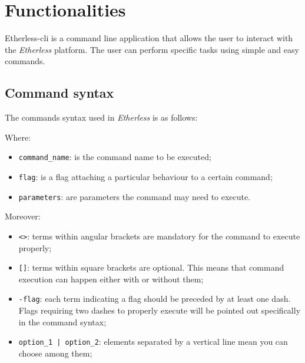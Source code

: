\section{Functionalities}
Etherless-cli is a command line application that allows the user to interact with the \textit{Etherless} platform. The user can perform specific tasks using simple and easy commands.

\subsection{Command syntax}
The commands syntax used in \textit{Etherless} is as follows:
\begin{center}
\end{center}
Where:
\begin{itemize}
	\item \texttt{command\_name}: is the command name to be executed;
	\item \texttt{flag}: is a flag attaching a particular behaviour to a certain command;
	\item \texttt{parameters}: are parameters the command may need to execute.
\end{itemize}
Moreover:
\begin{itemize}
	\item \texttt{<>}: terms within angular brackets are mandatory for the command to execute properly;
	\item \texttt{[]}: terms within square brackets are optional. This means that command execution can happen either with or without them;
	\item \texttt{-flag}: each term indicating a flag should be preceded by at least one dash. Flags requiring two dashes to properly execute will be pointed out specifically in the command syntax;
	\item \texttt{option\_1 | option\_2}: elements separated by a vertical line mean you can choose among them;
\end{itemize}

